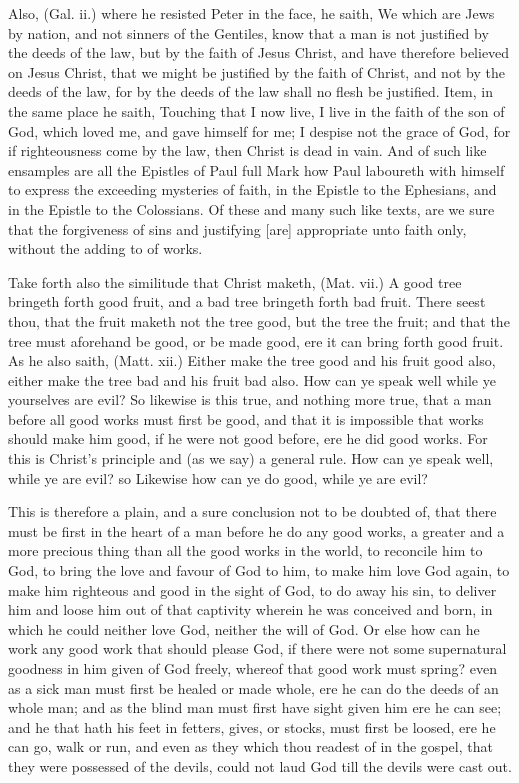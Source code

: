 \documentclass{article}
\begin{document}
Also, (Gal. ii.) where he resisted Peter in the face, he 
saith, We which are Jews by nation, and not sinners of the 
Gentiles, know that a man is not justified by the deeds of 
the law, but by the faith of Jesus Christ, and have therefore 
believed on Jesus Christ, that we might be justified by the 
faith of Christ, and not by the deeds of the law, for by the 
deeds of the law shall no flesh be justified. Item, in the 
same place he saith, Touching that I now live, I live in the 
faith of the son of God, which loved me, and gave himself 
for me; I despise not the grace of God, for if
righteousness come by the law, then Christ is dead in vain. And 
of such like ensamples are all the Epistles of Paul full 
Mark how Paul laboureth with himself to express the
exceeding mysteries of faith, in the Epistle to the Ephesians, 
and in the Epistle to the Colossians. Of these and many 
such like texts, are we sure that the forgiveness of sins 
and justifying [are] appropriate unto faith only, without the 
adding to of works. 

Take forth also the similitude that Christ maketh, (Mat. 
vii.) A good tree bringeth forth good fruit, and a bad tree 
bringeth forth bad fruit. There seest thou, that the fruit 
maketh not the tree good, but the tree the fruit; and that 
the tree must aforehand be good, or be made good, ere it 
can bring forth good fruit. As he also saith, (Matt. xii.) 
Either make the tree good and his fruit good also, either 
make the tree bad and his fruit bad also. How can ye 
speak well while ye yourselves are evil? So likewise is this 
true, and nothing more true, that a man before all good 
works must first be good, and that it is impossible that 
works should make him good, if he were not good before, 
ere he did good works. For this is Christ's principle and 
(as we say) a general rule. How can ye speak well, 
while ye are evil? so Likewise how can ye do good, while 
ye are evil? 

This is therefore a plain, and a sure conclusion not to 
be doubted of, that there must be first in the heart of a 
man before he do any good works, a greater and a more 
precious thing than all the good works in the world, to
reconcile him to God, to bring the love and favour of God to 
him, to make him love God again, to make him righteous 
and good in the sight of God, to do away his sin, to
deliver him and loose him out of that captivity wherein he 
was conceived and born, in which he could neither love 
God, neither the will of God. Or else how can he work 
any good work that should please God, if there were not 
some supernatural goodness in him given of God freely, 
whereof that good work must spring? even as a sick man 
must first be healed or made whole, ere he can do the deeds 
of an whole man; and as the blind man must first have sight 
given him ere he can see; and he that hath his feet in 
fetters, gives, or stocks, must first be loosed, ere he can go, 
walk or run, and even as they which thou readest of in 
the gospel, that they were possessed of the devils, could 
not laud God till the devils were cast out. 
\end{document}
